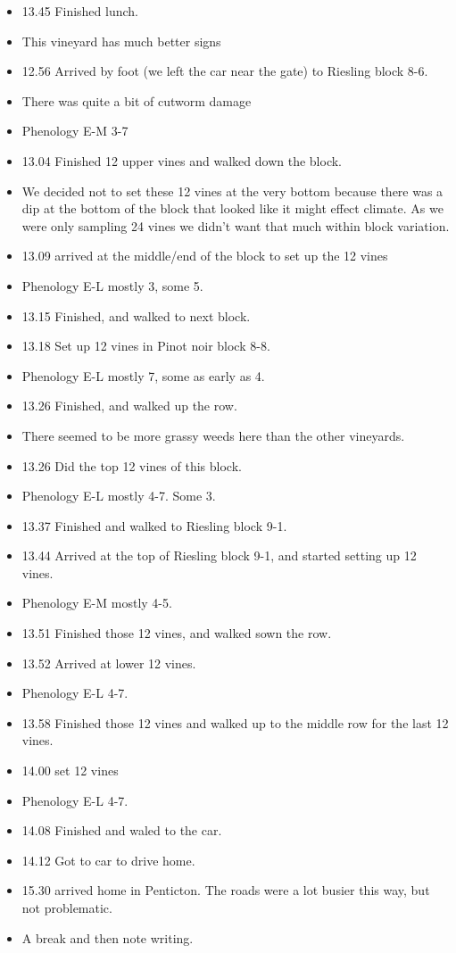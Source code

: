 \documentclass[11pt,letter]{article}
\newenvironment{smitemize}{
\begin{itemize}
  \setlength{\itemsep}{0pt}
  \setlength{\parskip}{0.8pt}
  \setlength{\parsep}{0pt}}
{\end{itemize}
}
\begin{document}
\begin{smitemize}
\item 13.45 Finished lunch.  
\item This vineyard has much better signs
\item 12.56 Arrived by foot (we left the car near the gate) to Riesling block 8-6. 
\item There was quite a bit of cutworm damage 
\item Phenology E-M 3-7
\item 13.04 Finished 12 upper vines and walked down the block.
\item We decided not to set these 12 vines at the very bottom because there was a dip at the bottom of the block that looked like it might effect climate. As we were only sampling 24 vines we didn't want that much within block variation. 
\item 13.09 arrived at the middle/end of the block to set up the 12 vines
\item Phenology E-L mostly 3, some 5.
\item 13.15 Finished, and walked to next block. 
\item 13.18 Set up 12 vines in Pinot noir block 8-8. 
\item Phenology E-L mostly 7, some as early as 4. 
\item 13.26 Finished, and walked up the row. 
\item There seemed to be more grassy weeds here than the other vineyards. 
\item 13.26 Did the top 12 vines of this block.
\item Phenology E-L mostly 4-7. Some 3. 
\item 13.37 Finished and walked to Riesling block 9-1.
\item 13.44 Arrived at the top of Riesling block 9-1, and started setting up 12 vines. 
\item Phenology E-M mostly 4-5. 
\item 13.51 Finished those 12 vines, and walked sown the row. 
\item 13.52 Arrived at lower 12 vines. 
\item Phenology E-L 4-7. 
\item 13.58 Finished those 12 vines and walked up to the middle row for the last 12 vines. 
\item 14.00 set 12 vines 
\item Phenology E-L 4-7. 
\item 14.08 Finished and waled to the car. 
\item 14.12 Got to car to drive home.
\item 15.30 arrived home in Penticton. The roads were a lot busier this way, but not problematic. 
\item A break and then note writing. 
\end{smitemize}
\end{document}
